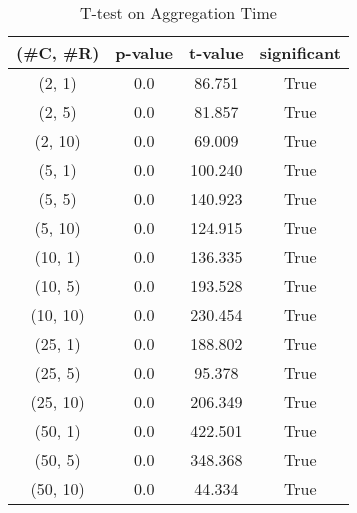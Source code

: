 \begin{table}[h]
\centering
\caption{T-test on Aggregation Time}
\label{tab:t-testAggregating}
\begin{tabular}{|c|c|c|c|}
\toprule
(\#C, \#R) &  p-value &  t-value &  significant \\
\midrule
  (2, 1) &      0.0 &   86.751 &         True \\
  (2, 5) &      0.0 &   81.857 &         True \\
 (2, 10) &      0.0 &   69.009 &         True \\
  (5, 1) &      0.0 &  100.240 &         True \\
  (5, 5) &      0.0 &  140.923 &         True \\
 (5, 10) &      0.0 &  124.915 &         True \\
 (10, 1) &      0.0 &  136.335 &         True \\
 (10, 5) &      0.0 &  193.528 &         True \\
(10, 10) &      0.0 &  230.454 &         True \\
 (25, 1) &      0.0 &  188.802 &         True \\
 (25, 5) &      0.0 &   95.378 &         True \\
(25, 10) &      0.0 &  206.349 &         True \\
 (50, 1) &      0.0 &  422.501 &         True \\
 (50, 5) &      0.0 &  348.368 &         True \\
(50, 10) &      0.0 &   44.334 &         True \\
\bottomrule
\end{tabular}
\end{table}
